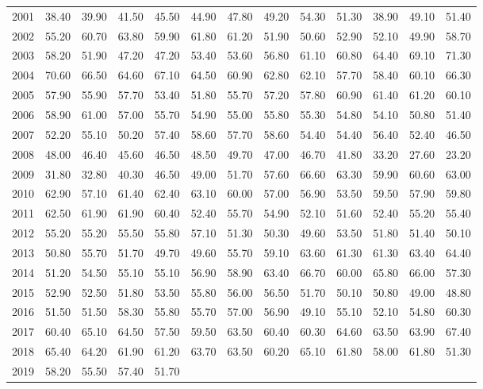 \begin{longtable}{rrrrrrrrrrrrr}
  2001 & 38.40 & 39.90 & 41.50 & 45.50 & 44.90 & 47.80 & 49.20 & 54.30 & 51.30 & 38.90 & 49.10 & 51.40 \\ 
  2002 & 55.20 & 60.70 & 63.80 & 59.90 & 61.80 & 61.20 & 51.90 & 50.60 & 52.90 & 52.10 & 49.90 & 58.70 \\ 
  2003 & 58.20 & 51.90 & 47.20 & 47.20 & 53.40 & 53.60 & 56.80 & 61.10 & 60.80 & 64.40 & 69.10 & 71.30 \\ 
  2004 & 70.60 & 66.50 & 64.60 & 67.10 & 64.50 & 60.90 & 62.80 & 62.10 & 57.70 & 58.40 & 60.10 & 66.30 \\ 
  2005 & 57.90 & 55.90 & 57.70 & 53.40 & 51.80 & 55.70 & 57.20 & 57.80 & 60.90 & 61.40 & 61.20 & 60.10 \\ 
  2006 & 58.90 & 61.00 & 57.00 & 55.70 & 54.90 & 55.00 & 55.80 & 55.30 & 54.80 & 54.10 & 50.80 & 51.40 \\ 
  2007 & 52.20 & 55.10 & 50.20 & 57.40 & 58.60 & 57.70 & 58.60 & 54.40 & 54.40 & 56.40 & 52.40 & 46.50 \\ 
  2008 & 48.00 & 46.40 & 45.60 & 46.50 & 48.50 & 49.70 & 47.00 & 46.70 & 41.80 & 33.20 & 27.60 & 23.20 \\ 
  2009 & 31.80 & 32.80 & 40.30 & 46.50 & 49.00 & 51.70 & 57.60 & 66.60 & 63.30 & 59.90 & 60.60 & 63.00 \\ 
  2010 & 62.90 & 57.10 & 61.40 & 62.40 & 63.10 & 60.00 & 57.00 & 56.90 & 53.50 & 59.50 & 57.90 & 59.80 \\ 
  2011 & 62.50 & 61.90 & 61.90 & 60.40 & 52.40 & 55.70 & 54.90 & 52.10 & 51.60 & 52.40 & 55.20 & 55.40 \\ 
  2012 & 55.20 & 55.20 & 55.50 & 55.80 & 57.10 & 51.30 & 50.30 & 49.60 & 53.50 & 51.80 & 51.40 & 50.10 \\ 
  2013 & 50.80 & 55.70 & 51.70 & 49.70 & 49.60 & 55.70 & 59.10 & 63.60 & 61.30 & 61.30 & 63.40 & 64.40 \\ 
  2014 & 51.20 & 54.50 & 55.10 & 55.10 & 56.90 & 58.90 & 63.40 & 66.70 & 60.00 & 65.80 & 66.00 & 57.30 \\ 
  2015 & 52.90 & 52.50 & 51.80 & 53.50 & 55.80 & 56.00 & 56.50 & 51.70 & 50.10 & 50.80 & 49.00 & 48.80 \\ 
  2016 & 51.50 & 51.50 & 58.30 & 55.80 & 55.70 & 57.00 & 56.90 & 49.10 & 55.10 & 52.10 & 54.80 & 60.30 \\ 
  2017 & 60.40 & 65.10 & 64.50 & 57.50 & 59.50 & 63.50 & 60.40 & 60.30 & 64.60 & 63.50 & 63.90 & 67.40 \\ 
  2018 & 65.40 & 64.20 & 61.90 & 61.20 & 63.70 & 63.50 & 60.20 & 65.10 & 61.80 & 58.00 & 61.80 & 51.30 \\ 
  2019 & 58.20 & 55.50 & 57.40 & 51.70 &  &  &  &  &  &  &  &  \\ 
   \hline
\hline
\end{longtable}
